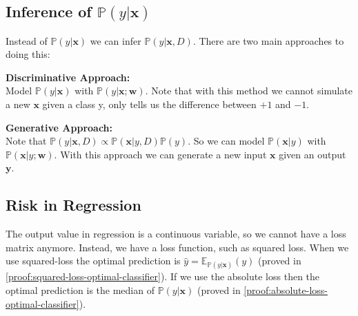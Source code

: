 \subsection{Inference of \texorpdfstring{$\mathbb{P}(y| \bm{x})$}{TEXT}}
Instead of $\mathbb{P}(y| \bm{x})$ we can infer $\mathbb{P}(y| \bm{x},D)$. There are two main approaches to doing this:
\begin{definition}
    \textbf{Discriminative Approach:} \\
    Model $\mathbb{P}(y| \bm{x})$ with $\mathbb{P}(y| \bm{x}; \bm{w})$. Note that with this method we cannot simulate a new $\bm{x}$ given a class y, only tells us the difference between $+1$ and $-1$. 
\end{definition}
\begin{definition}
    \textbf{Generative Approach:} \\
    Note that $\mathbb{P}(y|\bm{x},D) \propto \mathbb{P}(\bm{x}|y,D) \mathbb{P}(y)$. So we can model $\mathbb{P}(\bm{x}|y)$ with $\mathbb{P}(\bm{x}|y;\bm{w})$. With this approach we can generate a new input $\bm{x}$ given an output $\bm{y}$. 
\end{definition}

\subsection{Risk in Regression}
The output value in regression is a continuous variable, so we cannot have a loss matrix anymore. Instead, we have a loss function, such as squared loss. When we use squared-loss the optimal prediction is $\hat{y} = \mathbb{E}_{\mathbb{P}(y|\bm{x})} (y)$ (proved in \cref{proof:squared-loss-optimal-classifier}). If we use the absolute loss then the optimal prediction is the median of $\mathbb{P}(y| \bm{x})$ (proved in \cref{proof:absolute-loss-optimal-classifier}).